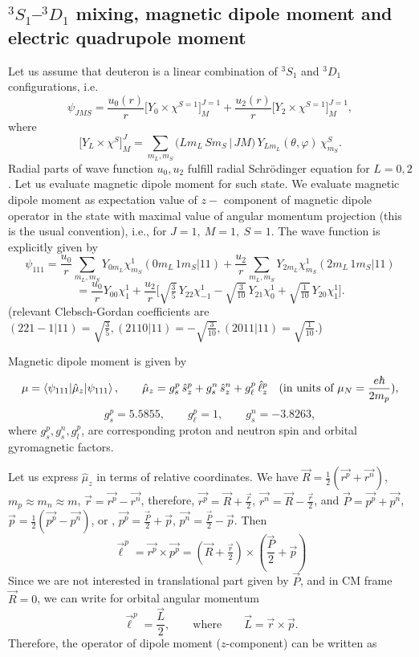 \documentclass[11pt,a4paper]{article}
\newcommand{\op}[1]{\hat{#1}}
\begin{document}
\subsection{\texorpdfstring{${}^3S_1$}{3S1}--\texorpdfstring{${}^3D_1$}{3D1} mixing, magnetic dipole moment and electric quadrupole moment}
Let us assume that deuteron is a linear combination of ${}^3S_1$ and ${}^3D_1$ configurations, i.e.
\[
\psi_{JMS}=\frac{u_0(r)}{r}\big[Y_0\times\chi^{S=1}\big]^{J=1}_M
+\frac{u_2(r)}{r}\big[Y_2\times\chi^{S=1}\big]^{J=1}_M,
\]
where
\[
\big[Y_L\times\chi^S\big]^J_M=\sum_{m_L,m_S}\big(Lm_L\,Sm_S\,|\,JM\big)\,Y_{Lm_L}(\theta,\varphi)\,\chi^S_{m_S}.
\]
Radial parts of wave function $u_0,u_2$ fulfill radial Schr\"odinger equation for $L=0,2$. Let us evaluate magnetic dipole moment for such state. We evaluate magnetic dipole moment as expectation value of $z-$ component of magnetic dipole operator in the state with maximal value of angular momentum projection (this is the usual convention), i.e., for $J=1,\ M=1,\ S=1$. The wave function is explicitly given by 
\[
\psi_{111}=\frac{u_0}{r}\sum_{m_L,m_S}Y_{0m_L}\chi^1_{m_S}(0m_L\,1m_S|11)
+\frac{u_2}{r}\sum_{m_L,m_S}Y_{2m_L}\chi^1_{m_S}(2m_L\,1m_S|11)
\]
\[
=\frac{u_0}{r}Y_{00} \chi^1_1
+\frac{u_2}{r}\Big[\sqrt{\tfrac35}\,Y_{22}\chi^1_{-1}-\sqrt{\tfrac{3}{10}}\,Y_{21}\chi^1_0
+\sqrt{\tfrac{1}{10}}\,Y_{20}\chi^1_1\Big].
\]
(relevant Clebsch-Gordan coefficients are $(221-1|11)=\sqrt{\frac{3}{5}}, (2110|11)=-\sqrt{\frac{3}{10}}, (2011|11)=\sqrt{\frac{1}{10}}$.)

Magnetic dipole moment is given by
\[
\mu=\braket{\psi_{111}|\op\mu_z|\psi_{111}},
\qquad
\op\mu_z=g_s^p\,\op s_z^p+g_s^n\,\op s_z^n+g_\ell^p\,\op\ell_z^p
\quad(\text{in units of }\mu_N=\frac{e \hbar}{2m_p}),
\]
\[
g_s^p=5.5855,\qquad g_\ell^p=1,\qquad g_s^n=-3.8263,
\]
where $g_s^p,g_s^n,g_l^p$, are corresponding proton and neutron spin and orbital gyromagnetic factors. 

Let us express $\op \mu_z$ in terms of relative coordinates. We have
$\vec R=\tfrac12( \vec {r^p}+\vec {r^n})$, $m_p\approx m_n\approx m$,
$\vec r=\vec {r^p}-\vec {r^n}$, therefore, $\vec {r^p}=\vec R+\tfrac{\vec r}{2}$, $\vec
{r^n}=\vec R-\tfrac{\vec r}{2}$, and $ \vec P=\vec {p^p}+\vec {p^n}$,
$\vec p=\tfrac12(\vec {p^p}-\vec {p^n})$, or ,  $\vec {p^p}=\tfrac{\vec P}{2}+\vec p$,
$\vec {p^n}=\tfrac{\vec P}{2}-\vec p$. Then
\[
\vec\ell^p=\vec {r^p}\times\vec {p^p}=(\vec R +\tfrac{\vec r}{2})\times(\frac{\vec P}{2}+ \vec p) 
\]
Since we are not interested in translational part given by $\vec P$, and in CM frame $\vec R = 0$, we can write for orbital angular momentum 
\[
\vec\ell^p=\frac{\vec L}{2},\qquad\text{where} \qquad \vec L = \vec r \times \vec p.   
\]
Therefore, the operator of dipole moment ($z$-component) can be written as 
\end{document}

